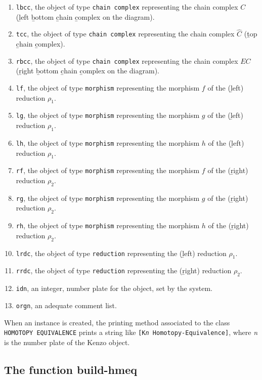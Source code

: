 \begin{enumerate}
\item {\tt lbcc}, the object of type {\tt chain complex}  representing the chain complex $C$
(\b left \b bottom \b chain \b complex on the diagram).
\item {\tt tcc},  the object of type {\tt chain complex}  representing the chain complex $\hat C$
(\b top \b chain \b complex).
\item {\tt rbcc}, the object of type {\tt chain complex}  representing the chain complex $EC$
(\b right \b bottom \b chain \b complex on the diagram).
\item {\tt lf}, the object of type {\tt morphism}  representing the morphism $f$ of the (\b left) reduction $\rho_1$.
\item {\tt lg}, the object of type {\tt morphism}  representing the morphism $g$ of the (\b left) reduction $\rho_1$.
\item {\tt lh}, the object of type {\tt morphism}  representing the morphism $h$ of the (\b left) reduction $\rho_1$.
\item {\tt rf}, the object of type {\tt morphism}  representing the morphism $f$ of the (\b right) reduction $\rho_2$.
\item {\tt rg}, the object of type {\tt morphism}  representing the morphism $g$ of the (\b right) reduction $\rho_2$.
\item {\tt rh}, the object of type {\tt morphism}  representing the morphism $h$ of the (\b right) reduction $\rho_2$.
\item {\tt lrdc},  the object of type {\tt reduction}  representing the  (\b left) reduction $\rho_1$.
\item {\tt rrdc},  the object of type {\tt reduction}  representing the (\b right) reduction $\rho_2$.
\item {\tt idn}, an integer, number plate for the object, set by the system.
\item {\tt orgn}, an adequate comment list.
\end{enumerate}
When an instance is created, the  printing method associated to the class {\tt HOMOTOPY EQUIVALENCE}
prints a string like {\tt [K{\em n} Homotopy-Equivalence]}, where {\em n} is the number plate of the Kenzo object.

\subsection {The function build-hmeq}

